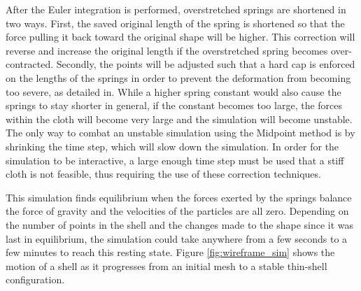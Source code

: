 \documentclass{thesis}
\begin{document}
After the Euler integration is performed, overstretched springs are shortened in two ways.  First, the saved original length of the
spring is shortened so that the force pulling it back toward the original shape will be higher.  This correction will reverse and
increase the original length if the overstretched spring becomes over-contracted.  Secondly, the points will be adjusted such that
a hard cap is enforced on the lengths of the springs in order to prevent the deformation from becoming too severe, as detailed
in\cite{provot95deformationconstraints}.  While a higher spring constant would also cause the springs to stay shorter in general,
if the constant becomes too large, the forces within the cloth will become very large and the simulation will become
unstable.  The only way to combat an unstable simulation using the Midpoint method is by shrinking the time step, which
will slow down the simulation.  In order for the simulation to be interactive, a large enough time step must be used that a stiff
cloth is not feasible, thus requiring the use of these correction techniques.

This simulation finds equilibrium when the forces exerted by the springs balance the force of gravity and the velocities of the particles
are all zero.  Depending on the number of points in the shell and the changes made to the shape since it was last in equilibrium, the
simulation could take anywhere from a few seconds to a few minutes to reach this resting state.  Figure \ref{fig:wireframe_sim} shows
the motion of a shell as it progresses from an initial mesh to a stable thin-shell configuration.
\end{document}
